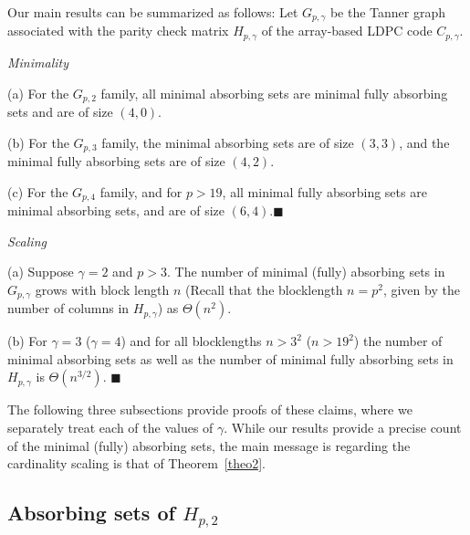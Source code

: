 Our main results can be summarized as follows: Let $G_{p,\gamma}$
be the Tanner graph associated with the parity check matrix
$H_{p,\gamma}$ of the array-based LDPC code $C_{p,\gamma}$.
\begin{theorem}\label{theo1}\emph{Minimality}

(a) For the $G_{p,2}$ family, all minimal absorbing sets are
minimal fully absorbing sets and are of size $(4,0)$.

(b) For the $G_{p,3}$ family, the minimal absorbing sets are of
size $(3,3)$, and the minimal fully absorbing sets are of size
$(4,2)$.

(c) For the $G_{p,4}$ family, and for $p>19$, all minimal fully
absorbing sets are minimal absorbing sets, and are of size
$(6,4)$.\hfill$\blacksquare$
\end{theorem}
\begin{theorem}\label{theo2}\emph{Scaling}

(a) Suppose $\gamma=2$ and $p>3$. The number of minimal (fully)
absorbing sets in $G_{p,\gamma}$ grows with block length $n$ (Recall
that the blocklength $n=p^2$, given by the number of columns in
$H_{p,\gamma}$) as $\Theta(n^{2})$.

(b) For $\gamma=3$ ($\gamma=4$) and for all blocklengths $n>3^2$
($n>19^2$) the number of minimal absorbing sets as well as the
number of minimal fully absorbing sets in $H_{p,\gamma}$ is
$\Theta(n^{3/2})$. \hfill$\blacksquare$
\end{theorem}

The following three subsections provide proofs of these claims,
where we separately treat each of the values of $\gamma$. While our
results provide a precise count of the minimal (fully) absorbing
sets, the main message is regarding the cardinality scaling is that
of Theorem~\ref{theo2}.

\vspace{-0.00in}\subsection{Absorbing sets of
$H_{p,2}$}\label{theo12}

